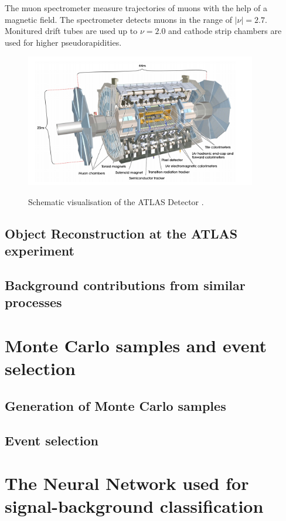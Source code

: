 The muon spectrometer measure trajectories of muons with the help of a magnetic field. The spectrometer detects muons in the range of $\bigl|\nu\bigr| = 2.7$. 
Monitured drift tubes are used up to $\nu = 2.0$ and cathode strip chambers are used for higher pseudorapidities.  
\begin{figure}
    \centering
    \includegraphics[width=0.9\textwidth]{Plots/atlasSCHEMA.PNG}
    \label{fig:atlasschema}
    \caption{Schematic visualisation of the ATLAS Detector \cite{Collaboration_2008}.}
\end{figure}



\section{Object Reconstruction at the ATLAS experiment}
\section{Background contributions from similar processes}





\chapter{Monte Carlo samples and event selection}
\section{Generation of Monte Carlo samples}
\section{Event selection}
\chapter{The Neural Network used for signal-background classification}

